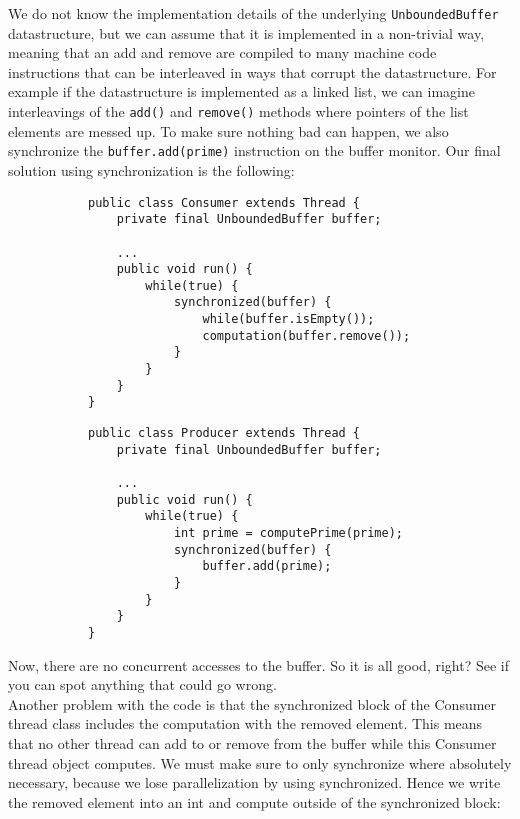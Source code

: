 \documentclass[main.tex]{subfiles}
\begin{document}
We do not know the implementation details of the underlying \texttt{UnboundedBuffer} datastructure, but we can assume that it is implemented in a non-trivial way, meaning that an add and remove are compiled to many machine code instructions that can be interleaved in ways that corrupt the datastructure. For example if the datastructure is implemented as a linked list, we can imagine interleavings of the \texttt{add()} and \texttt{remove()} methods where pointers of the list elements are messed up. To make sure nothing bad can happen, we also synchronize the \texttt{buffer.add(prime)} instruction on the buffer monitor. Our final solution using synchronization is the following:
\begin{figure}[H]
    \begin{subfigure}{.52\textwidth}
        \begin{verbatim}
public class Consumer extends Thread {
    private final UnboundedBuffer buffer;

    ...
    public void run() {
        while(true) {
            synchronized(buffer) {
                while(buffer.isEmpty());
                computation(buffer.remove());
            }
        }
    }
}
        \end{verbatim}
    \end{subfigure}%
    \begin{subfigure}{.52\textwidth}
        \begin{verbatim}
public class Producer extends Thread {
    private final UnboundedBuffer buffer;

    ...
    public void run() {
        while(true) {
            int prime = computePrime(prime);
            synchronized(buffer) {
                buffer.add(prime);
            }
        }
    }
}
        \end{verbatim}
    \end{subfigure}
\end{figure}
Now, there are no concurrent accesses to the buffer. So it is all good, right? See if you can spot anything that could go wrong.\\[3mm]
Another problem with the code is that the synchronized block of the Consumer thread class includes the computation with the removed element. This means that no other thread can add to or remove from the buffer while this Consumer thread object computes. We must make sure to only synchronize where absolutely necessary, because we lose parallelization by using synchronized. Hence we write the removed element into an int and compute outside of the synchronized block:
\end{document}
